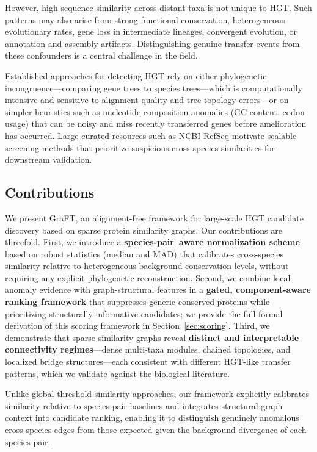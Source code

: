 \documentclass[11pt]{article}
\begin{document}
However, high sequence similarity across distant taxa is not unique to HGT. Such patterns may also arise from strong functional conservation, heterogeneous evolutionary rates, gene loss in intermediate lineages, convergent evolution, or annotation and assembly artifacts\cite{Dilucca2018}. Distinguishing genuine transfer events from these confounders is a central challenge in the field.

Established approaches for detecting HGT rely on either phylogenetic incongruence---comparing gene trees to species trees---which is computationally intensive and sensitive to alignment quality and tree topology errors\cite{Ragan2001,Philippe2011,MishraLercher2025}---or on simpler heuristics such as nucleotide composition anomalies (GC content, codon usage) that can be noisy and miss recently transferred genes before amelioration has occurred. Large curated resources such as NCBI RefSeq motivate scalable screening methods that prioritize suspicious cross-species similarities for downstream validation\cite{OLeary2016}.

\subsection{Contributions}

We present GraFT, an alignment-free framework for large-scale HGT candidate discovery based on sparse protein similarity graphs. Our contributions are threefold. First, we introduce a \textbf{species-pair--aware normalization scheme} based on robust statistics (median and MAD) that calibrates cross-species similarity relative to heterogeneous background conservation levels, without requiring any explicit phylogenetic reconstruction. Second, we combine local anomaly evidence with graph-structural features in a \textbf{gated, component-aware ranking framework} that suppresses generic conserved proteins while prioritizing structurally informative candidates; we provide the full formal derivation of this scoring framework in Section~\ref{sec:scoring}. Third, we demonstrate that sparse similarity graphs reveal \textbf{distinct and interpretable connectivity regimes}---dense multi-taxa modules, chained topologies, and localized bridge structures---each consistent with different HGT-like transfer patterns, which we validate against the biological literature.

Unlike global-threshold similarity approaches, our framework explicitly calibrates similarity relative to species-pair baselines and integrates structural graph context into candidate ranking, enabling it to distinguish genuinely anomalous cross-species edges from those expected given the background divergence of each species pair.
\end{document}
